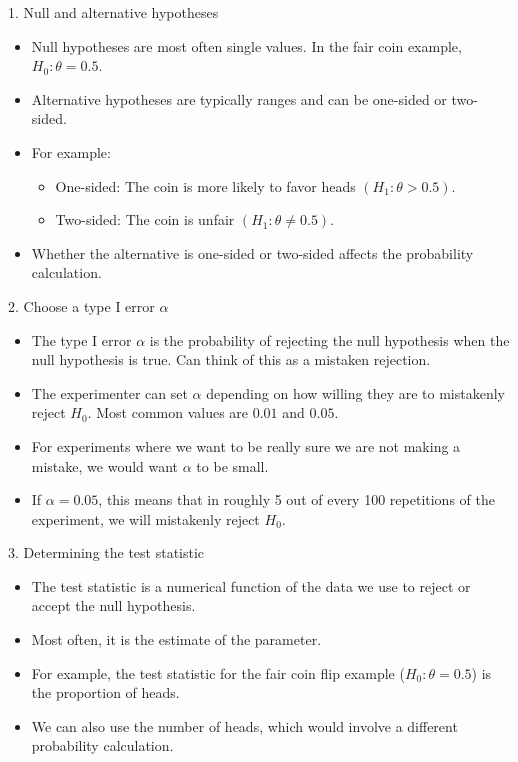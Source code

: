 \documentclass[10pt, handout, xcolor=table]{beamer}
\newcommand*\themecol{\usebeamercolor[fg]{structure}}
\begin{document}
\begin{frame}{1. Null and alternative hypotheses}

\begin{itemize}\itemsep3ex
\item Null hypotheses are most often single values. In the fair coin example, $H_0: \theta = 0.5$.
\item Alternative hypotheses are typically ranges and can be {\themecol one-sided} or {\themecol two-sided}.
\item For example:
\begin{itemize}
\item One-sided: The coin is more likely to favor heads $(H_1: \theta > 0.5)$.
\item Two-sided: The coin is unfair $(H_1: \theta \neq 0.5)$.
\end{itemize}
\item Whether the alternative is one-sided or two-sided affects the probability calculation.
\end{itemize}

\end{frame}

\begin{frame}{2. Choose a type I error $\alpha$}

\begin{itemize}\itemsep3ex
\item The type I error $\alpha$ is the probability of rejecting the null hypothesis when the null hypothesis is true. Can think of this as a mistaken rejection.
\item The experimenter can set $\alpha$ depending on how willing they are to mistakenly reject $H_0$. Most common values are $0.01$ and $0.05$.
\item For experiments where we want to be really sure we are not making a mistake, we would want $\alpha$ to be small.
\item If $\alpha = 0.05$, this means that in roughly 5 out of every 100 repetitions of the experiment, we will mistakenly reject $H_0$.
\end{itemize}

\end{frame}

\begin{frame}{3. Determining the test statistic}

\begin{itemize}\itemsep4ex
\item The test statistic is a numerical function of the data we use to reject or accept the null hypothesis.
\item Most often, it is the estimate of the parameter.
\item For example, the test statistic for the fair coin flip example ($H_0: \theta = 0.5$) is the proportion of heads.
\item We can also use the number of heads, which would involve a different probability calculation.
\end{itemize}

\end{frame}
\end{document}
